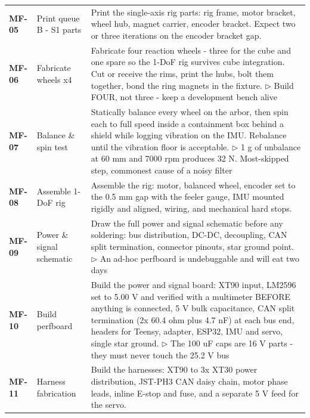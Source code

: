 {\begin{longtable}{@{}L{1.1cm} L{3.0cm} L{11.0cm}@{}}
\textbf{MF-05} & Print queue B - S1 parts & Print the single-axis rig parts: rig frame, motor bracket, wheel hub, magnet carrier, encoder bracket. Expect two or three iterations on the encoder bracket gap. \\[2pt]
\textbf{MF-06} & Fabricate wheels x4 & Fabricate four reaction wheels - three for the cube and one spare so the 1-DoF rig survives cube integration. Cut or receive the rims, print the hubs, bolt them together, bond the ring magnets in the fixture. \newline\textcolor{p0col}{\footnotesize$\triangleright$ Build FOUR, not three - keep a development bench alive} \\[2pt]
\textbf{MF-07} & Balance \& spin test & Statically balance every wheel on the arbor, then spin each to full speed inside a containment box behind a shield while logging vibration on the IMU. Rebalance until the vibration floor is acceptable. \newline\textcolor{p0col}{\footnotesize$\triangleright$ 1 g of unbalance at 60 mm and 7000 rpm produces 32 N. Most-skipped step, commonest cause of a noisy filter} \\[2pt]
\textbf{MF-08} & Assemble 1-DoF rig & Assemble the rig: motor, balanced wheel, encoder set to the 0.5 mm gap with the feeler gauge, IMU mounted rigidly and aligned, wiring, and mechanical hard stops. \\[2pt]
\textbf{MF-09} & Power \& signal schematic & Draw the full power and signal schematic before any soldering: bus distribution, DC-DC, decoupling, CAN split termination, connector pinouts, star ground point. \newline\textcolor{p0col}{\footnotesize$\triangleright$ An ad-hoc perfboard is undebuggable and will eat two days} \\[2pt]
\textbf{MF-10} & Build perfboard & Build the power and signal board: XT90 input, LM2596 set to 5.00 V and verified with a multimeter BEFORE anything is connected, 5 V bulk capacitance, CAN split termination (2x 60.4 ohm plus 4.7 nF) at each bus end, headers for Teensy, adapter, ESP32, IMU and servo, single star ground. \newline\textcolor{p0col}{\footnotesize$\triangleright$ The 100 uF caps are 16 V parts - they must never touch the 25.2 V bus} \\[2pt]
\textbf{MF-11} & Harness fabrication & Build the harnesses: XT90 to 3x XT30 power distribution, JST-PH3 CAN daisy chain, motor phase leads, inline E-stop and fuse, and a separate 5 V feed for the servo. \\[2pt]

\end{longtable}}
